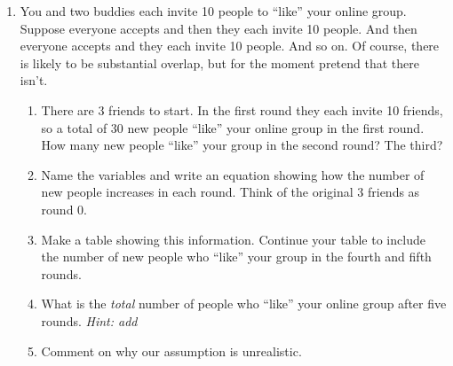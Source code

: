 \begin{enumerate}
\item You and two buddies each invite 10 people to ``like'' your online group.  Suppose everyone accepts and then they each invite 10 people.  And then everyone accepts and they each invite 10 people.  And so on. Of course, there is likely to be substantial overlap, but for the moment pretend that there isn't.  
\begin{enumerate}
\item There are 3 friends to start.  In the first round they each invite 10 friends, so a total of 30 new people ``like'' your online group in the first round.  How many new people ``like'' your group in the second round?  The third? \vfill
\item Name the variables and write an equation showing how the number of new people increases in each round. Think of the original 3 friends as round 0.\vfill \vfill
\item Make a table showing this information. Continue your table to include the number of new people who ``like'' your group in the fourth and fifth rounds. \vfill 
\item What is the \emph{total} number of people who ``like'' your online group after five rounds.  \emph{Hint: add} \vfill
\item Comment on why our assumption is unrealistic. \vfill
\end{enumerate} 

\end{enumerate}

